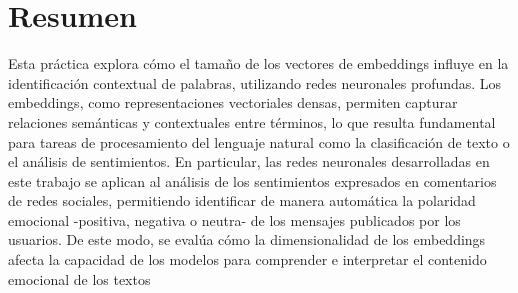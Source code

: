 \section{Resumen}

Esta práctica explora cómo el tamaño de los vectores de embeddings influye en la identificación contextual de 
palabras, utilizando redes neuronales profundas. Los embeddings, como representaciones vectoriales densas, permiten 
capturar relaciones semánticas y contextuales entre términos, lo que resulta fundamental para tareas de 
procesamiento del lenguaje natural como la clasificación de texto o el análisis de sentimientos. En particular, las 
redes neuronales desarrolladas en este trabajo se aplican al análisis de los sentimientos expresados en comentarios 
de redes sociales, permitiendo identificar de manera automática la polaridad emocional -positiva, negativa o neutra-
de los mensajes publicados por los usuarios. De este modo, se evalúa cómo la dimensionalidad de los embeddings 
afecta la capacidad de los modelos para comprender e interpretar el contenido emocional de los textos

